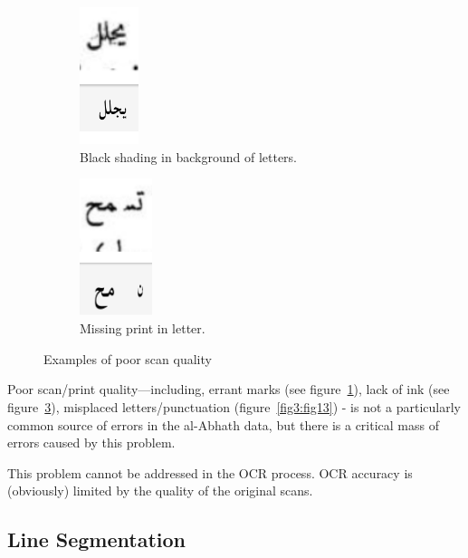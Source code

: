 \begin{figure}[H]
	\centering
	\begin{subfigure}[t]{4cm}
	\centering
	\includegraphics[height=4cm]{images/image14.png}
	\caption{Black shading in background of letters.}
	\label{fig3:fig27}
	\end{subfigure}
	\begin{subfigure}[t]{4cm}
	\centering
	\includegraphics[height=4cm]{images/image15.png}
	\caption{Missing print in letter.}
	\label{fig3:fig28}
	\end{subfigure}
	\caption{Examples of poor scan quality}
\end{figure} 

Poor scan/print quality—including, errant marks (see figure~\ref{fig3:fig27}), lack of ink
(see figure~\ref{fig3:fig28}), misplaced letters/punctuation (figure~\ref{fig3:fig13}) - is not a
particularly common source of errors in the al-Abhath data, but there is a
critical mass of errors caused by this problem.

This problem cannot be addressed in the OCR process. OCR accuracy is
(obviously) limited by the quality of the original scans.

\subsection{Line Segmentation}

